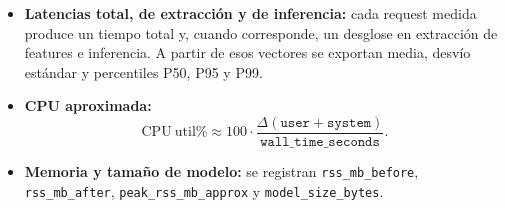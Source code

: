 \documentclass[12pt,oneside]{report}
\begin{document}
\begin{itemize}[leftmargin=*]
  \item \textbf{Latencias total, de extracción y de inferencia:}
  cada request medida produce un tiempo total y, cuando corresponde, un desglose en extracción de features e inferencia. A partir de esos vectores se exportan media, desvío estándar y percentiles P50, P95 y P99.

  \item \textbf{CPU aproximada:}
  \[
  \mathrm{CPU\ util\%}\approx 100\cdot\frac{\Delta(\texttt{user}+\texttt{system})}{\texttt{wall\_time\_seconds}}.
  \]

  \item \textbf{Memoria y tamaño de modelo:} se registran \texttt{rss\_mb\_before}, \texttt{rss\_mb\_after}, \texttt{peak\_rss\_mb\_approx} y \texttt{model\_size\_bytes}.
\end{itemize}
\end{document}
